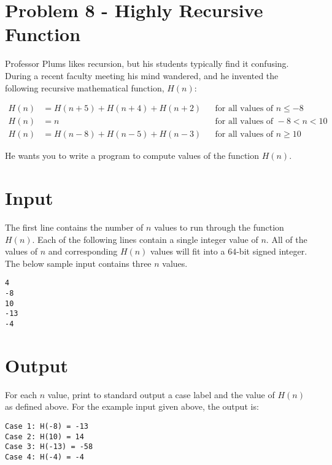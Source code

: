 \documentclass{article}
\begin{document}

\section*{Problem 8 - Highly Recursive Function}

Professor Plums likes recursion, but his students typically find it confusing.  During a recent faculty meeting his mind wandered, and he invented the following recursive mathematical function, $H(n)$:

\begin{align*}
	H(n) &= H(n+5) + H(n+4) + H(n+2)  &&\text{for all values of } n \leq -8 \\
	H(n) &= n  &&\text{for all values of } -8 <  n < 10 \\
	H(n) &= H(n-8) + H(n-5) + H(n-3) &&\text{for all values of } n \geq 10
\end{align*}

He wants you to write a program to compute values of the function $H(n)$.

\section*{Input}
The first line contains the number of $n$ values to run through the function $H(n)$.  Each of the following lines contain a single integer value of $n$.  All of the values of $n$ and corresponding $H(n)$ values will fit into a $64$-bit signed integer. The below sample input contains three $n$ values. 
\begin{verbatim}
4
-8
10
-13
-4
\end{verbatim}

\section*{Output}
For each $n$ value, print to standard output a case label and the value of $H(n)$ as defined above. For the example input given above, the output is:
\begin{verbatim}
Case 1: H(-8) = -13
Case 2: H(10) = 14
Case 3: H(-13) = -58
Case 4: H(-4) = -4
\end{verbatim}
\end{document}
